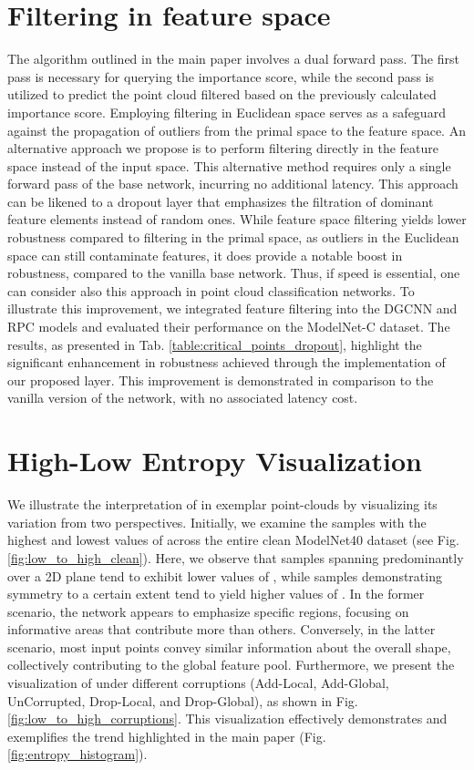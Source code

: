 \documentclass[10pt,twocolumn,letterpaper]{article}
\begin{document}
\section{Filtering in feature space}
The algorithm outlined in the main paper involves a dual forward pass. The first pass is necessary for querying the importance score, while the second pass is utilized to predict the point cloud filtered based on the previously calculated importance score. Employing filtering in Euclidean space serves as a safeguard against the propagation of outliers from the primal space to the feature space.
An alternative approach we propose is to perform filtering directly in the feature space instead of the input space. This alternative method requires only a single forward pass of the base network, incurring no additional latency. This approach can be likened to a dropout layer that emphasizes the filtration of dominant feature elements instead of random ones.
While feature space filtering yields lower robustness compared to filtering in the primal space, as outliers in the Euclidean space can still contaminate features, it does provide a notable boost in robustness, compared to the vanilla base network.
Thus, if speed is essential, one can consider also this approach in point cloud classification networks. 
To illustrate this improvement, we integrated feature filtering into the DGCNN \cite{dgcnn} and RPC \cite{modelnet_c} models and evaluated their performance on the ModelNet-C \cite{modelnet_c} dataset. The results, as presented in Tab. \ref{table:critical_points_dropout}, highlight the significant enhancement in robustness achieved through the implementation of our proposed layer. This improvement is demonstrated in comparison to the vanilla version of the network, with no associated latency cost.

\section{High-Low Entropy Visualization}
We illustrate the interpretation of  in exemplar point-clouds by visualizing its variation from two perspectives. Initially, we examine the samples with the highest and lowest values of  across the entire clean ModelNet40 dataset \cite{modelnet40} (see Fig. \ref{fig:low_to_high_clean}). Here, we observe that samples spanning predominantly over a 2D plane tend to exhibit lower values of , while samples demonstrating symmetry to a certain extent tend to yield higher values of . In the former scenario, the network appears to emphasize specific regions, focusing on informative areas that contribute more than others. Conversely, in the latter scenario, most input points convey similar information about the overall shape, collectively contributing to the global feature pool.
Furthermore, we present the visualization of  under different corruptions (Add-Local, Add-Global, UnCorrupted, Drop-Local, and Drop-Global), as shown in Fig. \ref{fig:low_to_high_corruptions}. This visualization effectively demonstrates and exemplifies the trend highlighted in the main paper (Fig. \ref{fig:entropy_histogram}).
\end{document}
